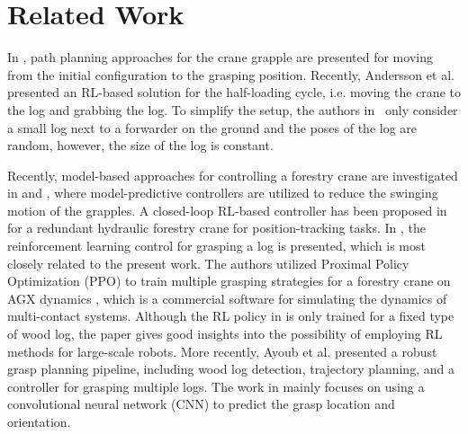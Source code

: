 \section{Related Work} \label{Sec:rw}

In \cite{ortiz2014increasing}, path planning approaches for the crane grapple are presented for moving from the initial configuration to the grasping position.  
Recently, Andersson et al. \cite{andersson2021reinforcement} presented an RL-based solution for the half-loading cycle, i.e. moving the crane to the log and grabbing the log. To simplify the setup, the authors in~\cite{andersson2021reinforcement} only consider a small log next to a forwarder on the ground and the poses of the log are random, however, the size of the log is constant. 

Recently, model-based approaches for controlling a forestry crane are investigated in  \cite{kalmari2014nonlinear} and \cite{hera2015model}, where model-predictive controllers are utilized to reduce the swinging motion of the grapples. A closed-loop RL-based controller has been proposed in \cite{dhakate2022autonomous} for a redundant hydraulic forestry crane for position-tracking tasks. In \cite{andersson2021reinforcement}, the reinforcement learning control for grasping a log is presented, which is most closely related to the present work. The authors utilized Proximal Policy Optimization (PPO) \cite{schulman2017proximal} to train multiple grasping strategies for a forestry crane on AGX dynamics \cite{algoryx}, which is a commercial software for simulating the dynamics of multi-contact systems. 
Although the RL policy in \cite{andersson2021reinforcement} is only trained for a fixed type of wood log, the paper gives good insights into the possibility of employing RL methods for large-scale robots. More recently, Ayoub et al. \cite{ayoub2023grasp} presented a robust grasp planning pipeline, including wood log detection, trajectory planning, and a controller for grasping multiple logs. The work in \cite{ayoub2023grasp} mainly focuses on using a convolutional neural network (CNN) to predict the grasp location and orientation. 